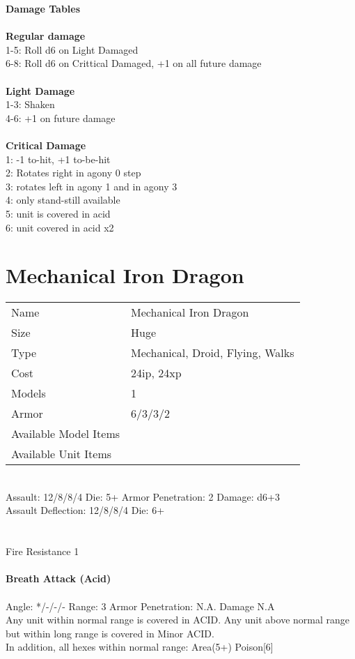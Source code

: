 {\bf Damage Tables} \\
\ \\ {\bf Regular damage } \\
1-5: Roll d6 on Light Damaged \\
6-8: Roll d6 on Crittical Damaged, +1 on all future damage \\
\ \\ {\bf Light Damage } \\
1-3: Shaken \\
4-6: +1 on future damage \\
\ \\ {\bf Critical Damage } \\
1: -1 to-hit, +1 to-be-hit \\
2: Rotates right in agony 0 step \\
3: rotates left in agony 1 and in agony 3 \\
4: only stand-still available \\
5: unit is covered in acid \\
6: unit covered in acid x2 \\









\pagebreak

\section{ Mechanical Iron Dragon }

\begin{tabular}{ll}
  Name & Mechanical Iron Dragon \\
  Size & Huge\\
  Type & Mechanical, Droid, Flying, Walks\\
  Cost & 24ip, 24xp\\
  Models & 1\\
  Armor & 6/3/3/2\\
  Available Model Items &  \\
  Available Unit Items &  \\
\end{tabular}

\ \\
Assault: 12/8/8/4 Die: 5+ Armor Penetration: 2 Damage: d6+3 \\
Assault Deflection: 12/8/8/4 Die: 6+\\
\indent  \\
\ \\
Fire Resistance 1
\ \\
\ \\
{\bf Breath Attack (Acid) } \\
\ \\
Angle: */-/-/- Range: 3 Armor Penetration: N.A. Damage N.A \\
\indent Any unit within normal range is covered in ACID. Any unit above normal range but within long range is covered in Minor ACID. \\ In addition, all hexes within normal range: Area(5+) Poison[6] \\



